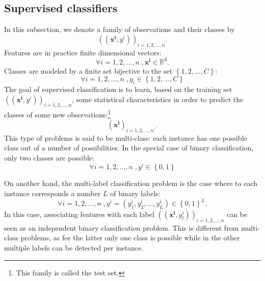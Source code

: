     \subsection{Supervised classifiers}
        \label{subsec::state_of_the_art::mlpr::classifiers}
        In this subsection, we denote a family of observations and their classes by
        \begin{equation*}
            \left((\bm{x^i}, y^i)\right)_{i=1,2,\dots,n}.
        \end{equation*}
        Features are in practice finite dimensional vectors:
        \begin{equation*}
            \forall i=1,2,\dots,n \;, \bm{x^i} \in \mathbb{R}^d.
        \end{equation*}
        Classes are modeled by a finite set bijective to the set \(\left\{1,2,\dots,C\right\}\):
        \begin{equation*}
            \forall i=1,2,\dots,n \;, y_i \in \left\{1,2,\dots,C\right\}            
        \end{equation*}
        The goal of supervised classification is to learn, based on the training set $\left((\bm{x^i}, y^i)\right)_{i=1,2,\dots,n}$, some statistical characteristics in order to predict the classes of some new observations:\footnote{This family is called the test set.}
        \begin{equation*}
            \left(\bm{x^i}\right)_{i=1,2,\dots,n'}.
        \end{equation*}
        This type of problems is said to be multi-class: each instance has one possible class out of a number of possibilities.
        In the special case of binary classification, only two classes are possible:
        \begin{equation*}
            \forall i=1,2,\dots,n \;, y^i \in \left\{0, 1\right\}
        \end{equation*}
        
        On another hand, the multi-label classification problem is the case where to each instance corresponds a number $L$ of binary labels:
        \begin{equation*}
            \forall i=1,2,\dots,n \;, y^i = (y^i_1, y^i_2, \dots, y^i_L) \in \left\{0, 1\right\}^L.
        \end{equation*}
        In this case, associating features with each label \(\left(\left(\bm{x^i}, y^i_l\right)\right)_{i=1,2,\dots,n}\) can be seen as an independent binary classification problem.
        This is different from multi-class problems, as for the latter only one class is possible while in the other multiple labels can be detected per instance.\\

